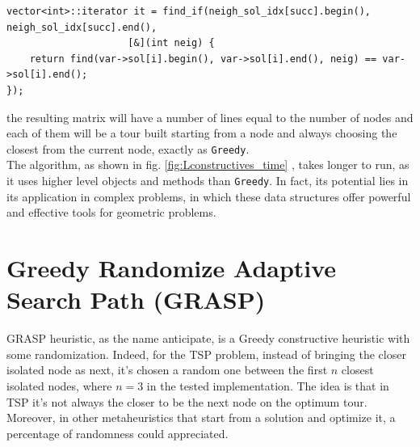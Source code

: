 \begin{lstlisting}
vector<int>::iterator it = find_if(neigh_sol_idx[succ].begin(), neigh_sol_idx[succ].end(),
					 [&](int neig) {
	return find(var->sol[i].begin(), var->sol[i].end(), neig) == var->sol[i].end();
});
\end{lstlisting}

the resulting matrix will have a number of lines equal to the number of nodes and each of them will be a tour built starting from a node and always choosing the closest from the current node, exactly as \texttt{Greedy}. \\
The algorithm, as shown in fig. \ref{fig:Lconstructives_time} , takes longer to run, as it uses higher level objects and methods than \texttt {Greedy}. In fact, its potential lies in its application in complex problems, in which these data structures offer powerful and effective tools for geometric problems.

\section{Greedy Randomize Adaptive Search Path (GRASP)}\label{sec:grasp}
GRASP heuristic, as the name anticipate, is a Greedy constructive heuristic with some randomization. Indeed, for the TSP problem, instead of bringing the closer isolated node as next, it's chosen a random one between the first $ n $ closest isolated nodes, where $ n = 3 $ in the tested implementation.
The idea is that in TSP it's not always the closer to be the next node on the optimum tour. Moreover, in other metaheuristics that start from a solution and optimize it, a percentage of randomness could appreciated.


